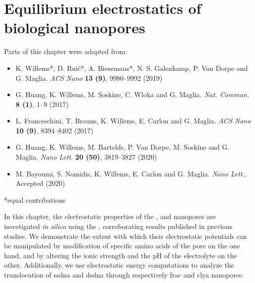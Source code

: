 \chapter{Equilibrium electrostatics of biological nanopores}
%
\label{ch:electrostatics}
%

%
%


%
%
\begin{shaded}
Parts of this chapter were adapted from:
%
\begin{itemize}
  \item K. Willems*, D. Rui\'{c}*, A. Biesemans*, N. S. Galenkamp, P. Van Dorpe and G. Maglia.
        \textit{ACS Nano} \textbf{13 (9)}, 9980--9992 (2019) %
  \item G. Huang, K. Willems, M. Soskine, C. Wloka and G. Maglia.
        \textit{Nat. Commun.} \textbf{8 (1)}, 1--9 (2017) %
  \item L. Franceschini,  T. Brouns, K. Willems, E. Carlon and G. Maglia.
        \textit{ACS Nano} \textbf{10 (9)}, 8394--8402 (2017) %
  \item G. Huang, K. Willems, M. Bartelds, P. Van Dorpe, M. Soskine and G. Maglia.
        \textit{Nano Lett.} \textbf{20 (50)}, 3819--3827 (2020) %
  \item M. Bayoumi, S. Nomidis, K. Willems, E. Carlon and G. Maglia.
        \textit{Nano Lett.}, Accepted (2020) %
\end{itemize}
%
*equal contributions
%
\newpage
\end{shaded}
%
%


In this chapter, the electrostatic properties of the ,  and 
nanopores are investigated \textit{in silico} using the , corroborating results published in
previous studies. We demonstrate the extent with which their electrostatic potentials can be manipulated by
modification of specific amino acids of the pore on the one hand, and by altering the ionic strength and the
pH of the electrolyte on the other. Additionally, we use electrostatic energy computations to analyze the
translocation of \gls{ssdna} and \gls{dsdna} through respectively \gls{frac} and \gls{clya} nanopores. \\
%

